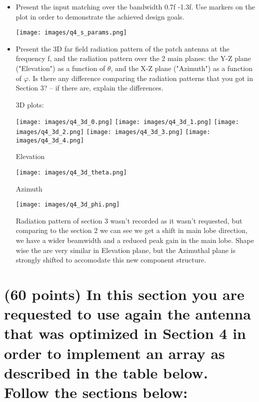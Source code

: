 \documentclass[12pt, letterpaper]{article}
\begin{document}
\begin{itemize}
  \item Present the input matching over the bandwidth 0.7f -1.3f. Use markers on the plot in order to demonstrate the achieved design goals.

  \texttt{[image: images/q4\_s\_params.png]}
  \item Present the 3D far field radiation pattern of the patch antenna at the frequency f, and the radiation pattern over the 2 main planes: the Y-Z plane ("Elevation") as a function of $\theta$, and the X-Z plane ("Azimuth") as a function of $\varphi$. Is there any difference comparing the radiation patterns that you got in Section 3? -- if there are, explain the differences.
  
  \begin{center}
    3D plots:
  \end{center}

  \texttt{[image: images/q4\_3d\_0.png]}
  \texttt{[image: images/q4\_3d\_1.png]}
  \texttt{[image: images/q4\_3d\_2.png]}
  \texttt{[image: images/q4\_3d\_3.png]}
  \texttt{[image: images/q4\_3d\_4.png]}

  \pagebreak
  \begin{center}
    Elevation
  \end{center}
  \texttt{[image: images/q4\_3d\_theta.png]}


  \pagebreak
  \begin{center}
    Azimuth
  \end{center}
  \texttt{[image: images/q4\_3d\_phi.png]}

  {\color{blue}Radiation pattern of section 3 wasn't recorded as it wasn't requested, but comparing to the section 2 we can see we get a shift in main lobe direction, we have a wider beamwidth and a reduced peak gain in the main lobe. Shape wise the are very similar in Elevation plane, but the Azimuthal plane is strongly shifted to accomodate this new component structure.}
\end{itemize}

\section{(60 points) In this section you are requested to use again the antenna that was optimized in Section 4 in order to implement an array as described in the table below. Follow the sections below:}
\end{document}
